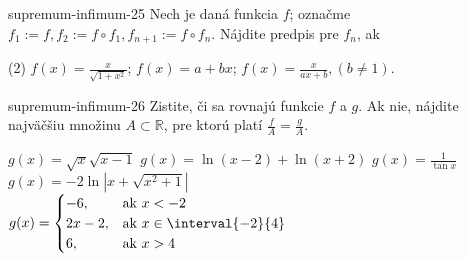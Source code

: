 \begin{defproblem}{supremum-infimum-25}
Nech je daná funkcia $f$; označme $f_1:=f,f_2:=f\circ f_1,f_{n+1}:=f\circ f_n$. Nájdite predpis pre $f_n$, ak
\begin{tasks}(2)
  \task $f(x)=\frac{x}{\sqrt{1+x^2}}$;
  \task $f(x)=a+bx$;
  \task $f(x)=\frac{x}{ax+b},(b\neq 1)$.
\end{tasks}
\end{defproblem}

\begin{defproblem}{supremum-infimum-26}
Zistite, či sa rovnajú funkcie $f$ a $g$. Ak nie, nájdite najväčšiu množinu
$A\subset\mathbb{R}$, pre ktorú platí $\frac{f}{A}=\frac{g}{A}$.
\begin{tasks}
  \task
    $g(x) = \sqrt{x} \sqrt{x-1}$
  \task
    $g(x) = \ln{(x-2)} + \ln{(x+2)}$
  \task
    $g(x) = \frac{1}{\tan{x}}$
  \task
    $g(x) = -2 \ln{|x+\sqrt{x^2+1}|}$
  \task
    \\
    $g(x) =
      \begin{cases}
        -6,     & \text{ak } x < -2 \\
        2x - 2, & \text{ak } x \in \interval{-2}{4} \\
        6,      & \text{ak } x > 4
      \end{cases}
    $
\end{tasks}
\end{defproblem}

